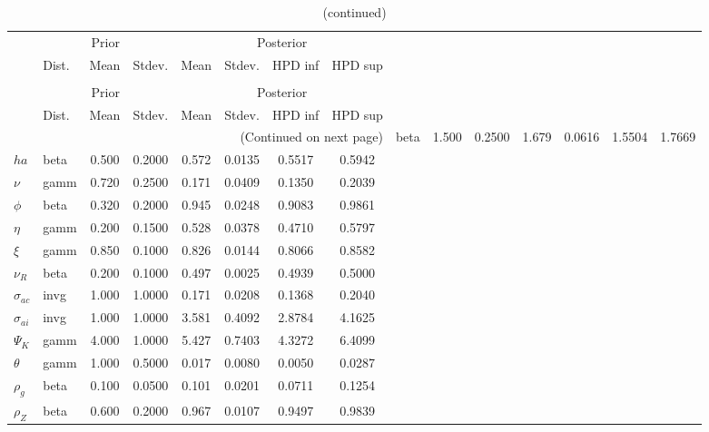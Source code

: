  
\begin{center}
\begin{longtable}{llcccccc} 
\caption{Results from Metropolis-Hastings (parameters)}
 \label{Table:MHPosterior:1}\\
\toprule 
  & \multicolumn{3}{c}{Prior}  &  \multicolumn{4}{c}{Posterior} \\
  \cmidrule(r{.75em}){2-4} \cmidrule(r{.75em}){5-8}
  & Dist. & Mean  & Stdev. & Mean & Stdev. & HPD inf & HPD sup\\
\midrule \endfirsthead 
\caption{(continued)}\\\toprule 
  & \multicolumn{3}{c}{Prior}  &  \multicolumn{4}{c}{Posterior} \\
  \cmidrule(r{.75em}){2-4} \cmidrule(r{.75em}){5-8}
  & Dist. & Mean  & Stdev. & Mean & Stdev. & HPD inf & HPD sup\\
\midrule \endhead 
\bottomrule \multicolumn{8}{r}{(Continued on next page)} \endfoot 
\bottomrule \endlastfoot 
${\sigma}$ & beta &   1.500 & 0.2500 &   1.679& 0.0616 &  1.5504 &  1.7669 \\ 
${ha}$ & beta &   0.500 & 0.2000 &   0.572& 0.0135 &  0.5517 &  0.5942 \\ 
$\nu$ & gamm &   0.720 & 0.2500 &   0.171& 0.0409 &  0.1350 &  0.2039 \\ 
${\phi}$ & beta &   0.320 & 0.2000 &   0.945& 0.0248 &  0.9083 &  0.9861 \\ 
${\eta}$ & gamm &   0.200 & 0.1500 &   0.528& 0.0378 &  0.4710 &  0.5797 \\ 
$\xi$ & gamm &   0.850 & 0.1000 &   0.826& 0.0144 &  0.8066 &  0.8582 \\ 
${\nu_R}$ & beta &   0.200 & 0.1000 &   0.497& 0.0025 &  0.4939 &  0.5000 \\ 
${\sigma_{ac}}$ & invg &   1.000 & 1.0000 &   0.171& 0.0208 &  0.1368 &  0.2040 \\ 
${\sigma_{ai}}$ & invg &   1.000 & 1.0000 &   3.581& 0.4092 &  2.8784 &  4.1625 \\ 
${\Psi_{K}}$ & gamm &   4.000 & 1.0000 &   5.427& 0.7403 &  4.3272 &  6.4099 \\ 
${\theta}$ & gamm &   1.000 & 0.5000 &   0.017& 0.0080 &  0.0050 &  0.0287 \\ 
${\rho_g}$ & beta &   0.100 & 0.0500 &   0.101& 0.0201 &  0.0711 &  0.1254 \\ 
${\rho_Z}$ & beta &   0.600 & 0.2000 &   0.967& 0.0107 &  0.9497 &  0.9839 \\ 

\end{longtable}
\end{center}
